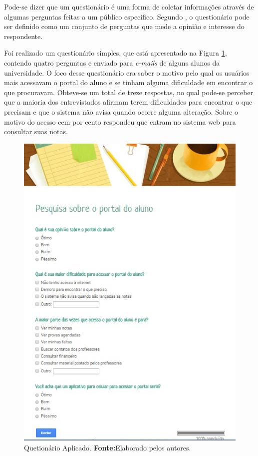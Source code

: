 
	\par Pode-se dizer que um questionário é uma forma de coletar informações
através de algumas perguntas feitas a um público específico. Segundo
, o questionário pode ser definido como um conjunto
de perguntas que mede a opinião e interesse do respondente.

	\par Foi realizado um questionário simples, que está apresentado na Figura
\ref{fig:qm1}, contendo quatro perguntas e enviado para \textit{e-mails} de
alguns alunos da universidade. O foco desse questionário era saber o motivo pelo qual
os usuários mais acessavam o portal do aluno e se tinham alguma dificuldade em
encontrar o que procuravam. Obteve-se um total de treze respostas, no qual
pode-se perceber que a maioria dos entrevistados afirmam terem dificuldades
para encontrar o que precisam e que o sistema não avisa quando ocorre alguma
alteração. Sobre o motivo do acesso cem por cento respondeu que entram no
sistema web para consultar suas notas.
\pagebreak
\begin{figure}[h!]
	\centerline{\includegraphics[scale=0.5]{./imagens/2_q_metodologico/qm1.png}}
	\caption[Quetionário Aplicado]{Quetionário Aplicado.
		\textbf{Fonte:}Elaborado pelos autores.}
	\label{fig:qm1}
\end{figure}
	

